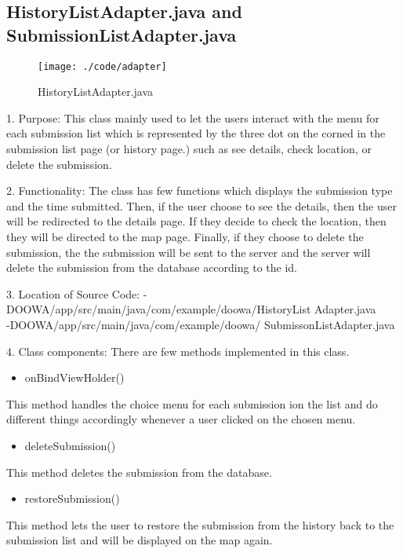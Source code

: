 \documentclass[conference]{IEEEtran}
\begin{document}
\subsection{HistoryListAdapter.java and SubmissionListAdapter.java}
\begin{figure}[h!]
\texttt{[image: ./code/adapter]}
\centering
\caption{HistoryListAdapter.java}
\end{figure}
1. Purpose: This class mainly used to let the users interact with the menu for each submission list which is represented by the three dot on the corned in the submission list page (or history page.) such as see details, check location, or delete the submission.\break
\par 2. Functionality: The class has few functions which displays the submission type and the time submitted. Then, if the user choose to see the details, then the user will be redirected to the details page. If they decide to check the location, then they will be directed to the map page. Finally, if they choose to delete the submission, the the submission will be sent to the server and the server will delete the submission from the database according to the id.\break

3. Location of Source Code: -DOOWA/app/src/main/java/com/example/doowa/HistoryList Adapter.java\\
-DOOWA/app/src/main/java/com/example/doowa/ SubmissonListAdapter.java
\break

4. Class components: There are few methods implemented in this class.
\begin{itemize}
\item onBindViewHolder()
\end{itemize}
This method handles the choice menu for each submission ion the list and do different things accordingly whenever a user clicked on the chosen menu.
\begin{itemize}
\item deleteSubmission()
\end{itemize}
This method deletes the submission from the database.
\begin{itemize}
\item restoreSubmission()
\end{itemize}
This method lets the user to restore the submission from the history back to the submission list and will be displayed on the map again.
\break
\end{document}

